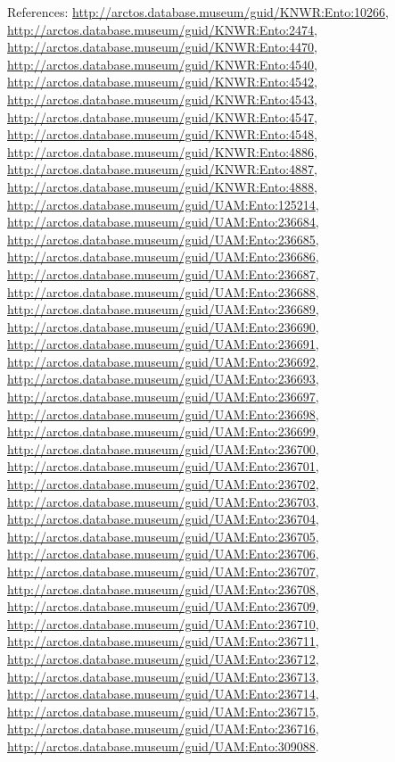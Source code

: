 \documentclass[9pt, article]{memoir}
\begin{document}
\begin{multicols}{2}
\vspace{6pt}References: 
\url{http://arctos.database.museum/guid/KNWR:Ento:10266}, 
\url{http://arctos.database.museum/guid/KNWR:Ento:2474}, 
\url{http://arctos.database.museum/guid/KNWR:Ento:4470}, 
\url{http://arctos.database.museum/guid/KNWR:Ento:4540}, 
\url{http://arctos.database.museum/guid/KNWR:Ento:4542}, 
\url{http://arctos.database.museum/guid/KNWR:Ento:4543}, 
\url{http://arctos.database.museum/guid/KNWR:Ento:4547}, 
\url{http://arctos.database.museum/guid/KNWR:Ento:4548}, 
\url{http://arctos.database.museum/guid/KNWR:Ento:4886}, 
\url{http://arctos.database.museum/guid/KNWR:Ento:4887}, 
\url{http://arctos.database.museum/guid/KNWR:Ento:4888}, 
\url{http://arctos.database.museum/guid/UAM:Ento:125214}, 
\url{http://arctos.database.museum/guid/UAM:Ento:236684}, 
\url{http://arctos.database.museum/guid/UAM:Ento:236685}, 
\url{http://arctos.database.museum/guid/UAM:Ento:236686}, 
\url{http://arctos.database.museum/guid/UAM:Ento:236687}, 
\url{http://arctos.database.museum/guid/UAM:Ento:236688}, 
\url{http://arctos.database.museum/guid/UAM:Ento:236689}, 
\url{http://arctos.database.museum/guid/UAM:Ento:236690}, 
\url{http://arctos.database.museum/guid/UAM:Ento:236691}, 
\url{http://arctos.database.museum/guid/UAM:Ento:236692}, 
\url{http://arctos.database.museum/guid/UAM:Ento:236693}, 
\url{http://arctos.database.museum/guid/UAM:Ento:236697}, 
\url{http://arctos.database.museum/guid/UAM:Ento:236698}, 
\url{http://arctos.database.museum/guid/UAM:Ento:236699}, 
\url{http://arctos.database.museum/guid/UAM:Ento:236700}, 
\url{http://arctos.database.museum/guid/UAM:Ento:236701}, 
\url{http://arctos.database.museum/guid/UAM:Ento:236702}, 
\url{http://arctos.database.museum/guid/UAM:Ento:236703}, 
\url{http://arctos.database.museum/guid/UAM:Ento:236704}, 
\url{http://arctos.database.museum/guid/UAM:Ento:236705}, 
\url{http://arctos.database.museum/guid/UAM:Ento:236706}, 
\url{http://arctos.database.museum/guid/UAM:Ento:236707}, 
\url{http://arctos.database.museum/guid/UAM:Ento:236708}, 
\url{http://arctos.database.museum/guid/UAM:Ento:236709}, 
\url{http://arctos.database.museum/guid/UAM:Ento:236710}, 
\url{http://arctos.database.museum/guid/UAM:Ento:236711}, 
\url{http://arctos.database.museum/guid/UAM:Ento:236712}, 
\url{http://arctos.database.museum/guid/UAM:Ento:236713}, 
\url{http://arctos.database.museum/guid/UAM:Ento:236714}, 
\url{http://arctos.database.museum/guid/UAM:Ento:236715}, 
\url{http://arctos.database.museum/guid/UAM:Ento:236716}, 
\url{http://arctos.database.museum/guid/UAM:Ento:309088}.


\end{multicols}
\end{document}
